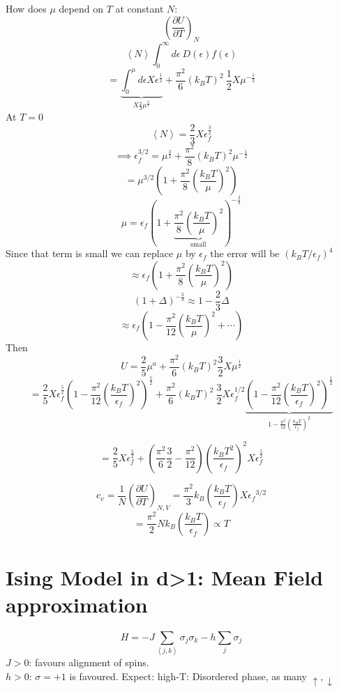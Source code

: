 \documentclass[11pt]{book}
\theoremstyle{definition}
\begin{document}
How does $ \mu $ depend on $ T $ at constant $ N $:
\[ \left( \frac{\partial U}{\partial T} \right)_{N}  \] 
\[ \left \langle N \right \rangle \int_0^{\infty} d \epsilon \: D( \epsilon ) f( \epsilon )\] 
\[ = \underbrace{\int_0^{\mu} d \epsilon X \epsilon^{ \frac{1}{2} }}_{ X\frac{2}{3}\mu^{\frac{3}{2}} } + \frac{\pi^2}{6}(k_BT)^2 \: \frac{1}{2}X \mu^{- \frac{1}{2}} \] 
At $ T = 0 $ 
\[ \left \langle N \right \rangle = \frac{2}{3} X \epsilon_f^{\frac{3}{2}} \] 
\[ \implies \epsilon_f^{3/2} = \mu^{\frac{3}{2}} + \frac{\pi^2}{8} (k_BT)^2 \mu^{- \frac{1}{2}}\] 
\[  = \mu^{3/2} \left( 1 + \frac{\pi^2}{8} \left(  \frac{k_BT}{\mu} \right)^2  \right)  \] 
\[ \mu = \epsilon_f \left( 1 + 
\underbrace{\frac{\pi^2}{8} \left(  \frac{k_BT}{\mu} \right)^2}_{\text{small}} \right)^{-\frac{2}{3}} \] 
Since that term is small we can replace $ \mu $ by $ \epsilon_f $ the error will be $ (k_BT/\epsilon_f)^4 $  
\[ \approx \epsilon_f \left( 1 + 
\frac{\pi^2}{8} \left(  \frac{k_BT}{\mu} \right)^2 \right) \] 
\[ (1+\Delta)^{-\frac{2}{3}} \approx 1 - \frac{2}{3} \Delta  \] 
\[ \approx \epsilon_f \left( 1 - \frac{\pi^2}{12} \left(  \frac{k_BT}{\mu} \right)^2 + \cdots \right)\] 
Then 
\[ U = \frac{2}{5} \mu^{a} 
+ \frac{\pi^2}{6} (k_BT)^2 \frac{3}{2} X \mu^{ \frac{1}{2} } \] 
\[  = \frac{2}{5}X \epsilon_f ^{\frac{5}{2}} \left( 1 - \frac{\pi^2}{12} \left( \frac{k_BT}{\epsilon_f} \right)^2  \right)^{\frac{5}{2}} 
+ \frac{\pi^2}{6}(k_BT)^2 \: \frac{3}{2} X \epsilon_f^{1/2} 
\underbrace{\left( 1 - \frac{\pi^2}{12} \left( \frac{k_BT}{\epsilon_f} \right)^2 \right)^{ \frac{1}{2} } }_{1 - \frac{\pi^2}{12} \left( \frac{k_BT}{\epsilon_f} \right)^2 }  \] 

\[ = \frac{2}{5}X \epsilon_f^{\frac{5}{2}} + (\frac{\pi^2}{6} \frac{3}{2} - \frac{\pi^2}{12}) 
\left(\frac{k_BT^2}{\epsilon_f} \right)^2 X \epsilon_f^{\frac{5}{2} }\] 

\[ c_v = \frac{1}{N} \left( \frac{\partial U}{\partial T} \right)_{N,V} = \frac{\pi^2}{3} k_B \left( \frac{k_BT}{\epsilon_f} \right) X{\epsilon_f}^{3/2} \] 
\[ = \frac{\pi^2}{2} N k_B \left( \frac{k_BT}{\epsilon_f} \right) \propto  T \] 

\section{Ising Model in d>1: Mean Field approximation}
\[ H = -J \sum_{\left \langle j,k \right \rangle } \sigma_j\sigma_k - h \sum_j \sigma_j \] 
$ J > 0 $: favours alignment of spins. \\
$ h > 0 $: $ \sigma = +1 $ is favoured.
Expect: high-T: Disordered phase, as many $ \uparrow, \downarrow $ 
\end{document}
